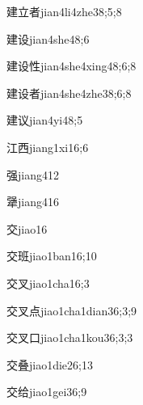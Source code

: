 \begin{verbete}{建立者}{jian4li4zhe3}{8;5;8}
\end{verbete}
\begin{verbete}{建设}{jian4she4}{8;6}
\end{verbete}
\begin{verbete}{建设性}{jian4she4xing4}{8;6;8}
\end{verbete}
\begin{verbete}{建设者}{jian4she4zhe3}{8;6;8}
\end{verbete}
\begin{verbete}{建议}{jian4yi4}{8;5}
\end{verbete}
\begin{verbete}{江西}{jiang1xi1}{6;6}
\end{verbete}
\begin{verbete}{强}{jiang4}{12}
\end{verbete}
\begin{verbete}{犟}{jiang4}{16}
\end{verbete}
\begin{verbete}{交}{jiao1}{6}
\end{verbete}
\begin{verbete}{交班}{jiao1ban1}{6;10}
\end{verbete}
\begin{verbete}{交叉}{jiao1cha1}{6;3}
\end{verbete}
\begin{verbete}{交叉点}{jiao1cha1dian3}{6;3;9}
\end{verbete}
\begin{verbete}{交叉口}{jiao1cha1kou3}{6;3;3}
\end{verbete}
\begin{verbete}{交叠}{jiao1die2}{6;13}
\end{verbete}
\begin{verbete}{交给}{jiao1gei3}{6;9}
\end{verbete}

